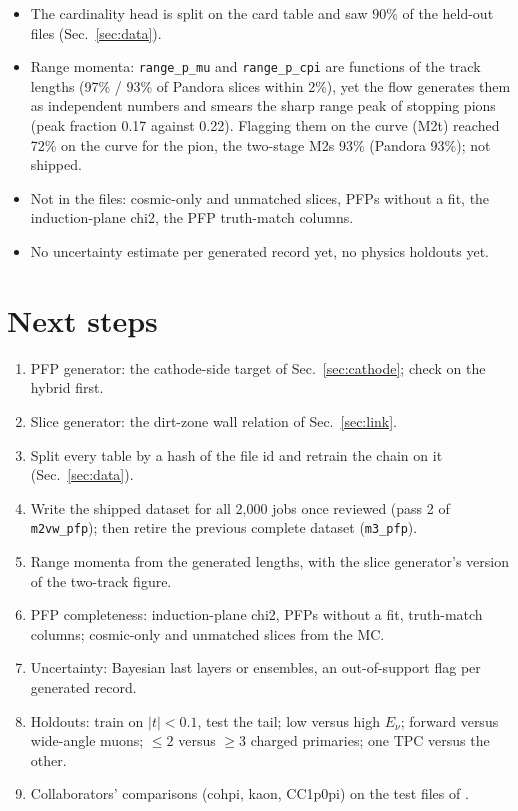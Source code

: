 \documentclass[11pt]{article}
\newcommand{\real}{Pandora}
\begin{document}
\begin{itemize}
\item The cardinality head is split on the card table and saw 90\% of the held-out files (Sec.~\ref{sec:data}).
\item Range momenta: \texttt{range\_p\_mu} and \texttt{range\_p\_cpi} are functions of the track lengths (97\% /
      93\% of \real{} slices within 2\%), yet the flow generates them as independent numbers and smears the sharp
      range peak of stopping pions (peak fraction 0.17 against 0.22). Flagging them on the curve (M2t) reached 72\%
      on the curve for the pion, the two-stage M2s 93\% (\real{} 93\%); not shipped.
\item Not in the files: cosmic-only and unmatched slices, PFPs without a fit, the induction-plane chi2, the PFP
      truth-match columns.
\item No uncertainty estimate per generated record yet, no physics holdouts yet.
\end{itemize}

\section{Next steps}
\label{sec:next}

\begin{enumerate}
\item PFP generator: the cathode-side target of Sec.~\ref{sec:cathode}; check on the hybrid first.
\item Slice generator: the dirt-zone wall relation of Sec.~\ref{sec:link}.
\item Split every table by a hash of the file id and retrain the chain on it (Sec.~\ref{sec:data}).
\item Write the shipped dataset for all 2,000 jobs once reviewed (pass 2 of \texttt{m2vw\_pfp}); then retire the
      previous complete dataset (\texttt{m3\_pfp}).
\item Range momenta from the generated lengths, with the slice generator's version of the two-track figure.
\item PFP completeness: induction-plane chi2, PFPs without a fit, truth-match columns; cosmic-only and unmatched
      slices from the MC.
\item Uncertainty: Bayesian last layers or ensembles, an out-of-support flag per generated record.
\item Holdouts: train on $|t|<0.1$, test the tail; low versus high $E_\nu$; forward versus wide-angle muons;
      $\le2$ versus $\ge3$ charged primaries; one TPC versus the other.
\item Collaborators' comparisons (cohpi, kaon, CC1p0pi) on the test files of .
\end{enumerate}
\end{document}
